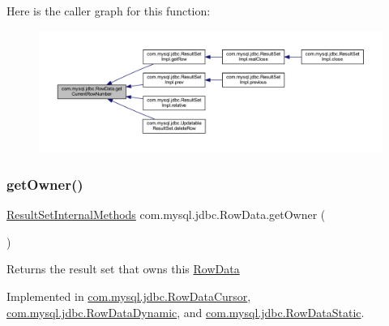 Here is the caller graph for this function\+:
\nopagebreak
\begin{figure}[H]
\begin{center}
\leavevmode
\includegraphics[width=350pt]{interfacecom_1_1mysql_1_1jdbc_1_1_row_data_aec8ec45fafa52ded12507aa708efbdf7_icgraph}
\end{center}
\end{figure}
\mbox{\label{interfacecom_1_1mysql_1_1jdbc_1_1_row_data_adb65eef9f8713ed4c3a1eb67eafaaf86}} 
\subsubsection{\texorpdfstring{get\+Owner()}{getOwner()}}
{\footnotesize\ttfamily \mbox{\hyperlink{interfacecom_1_1mysql_1_1jdbc_1_1_result_set_internal_methods}{Result\+Set\+Internal\+Methods}} com.\+mysql.\+jdbc.\+Row\+Data.\+get\+Owner (\begin{DoxyParamCaption}{ }\end{DoxyParamCaption})}

Returns the result set that \textquotesingle{}owns\textquotesingle{} this \mbox{\hyperlink{interfacecom_1_1mysql_1_1jdbc_1_1_row_data}{Row\+Data}} 

Implemented in \mbox{\hyperlink{classcom_1_1mysql_1_1jdbc_1_1_row_data_cursor_a82d9aac57045528a72f5d979fe7490bd}{com.\+mysql.\+jdbc.\+Row\+Data\+Cursor}}, \mbox{\hyperlink{classcom_1_1mysql_1_1jdbc_1_1_row_data_dynamic_af879dc010e19afaf62c037d9cfca5c8f}{com.\+mysql.\+jdbc.\+Row\+Data\+Dynamic}}, and \mbox{\hyperlink{classcom_1_1mysql_1_1jdbc_1_1_row_data_static_af72520ce25978b10995a00de1bd2ecc4}{com.\+mysql.\+jdbc.\+Row\+Data\+Static}}.

\mbox{\label{interfacecom_1_1mysql_1_1jdbc_1_1_row_data_a630ce5b4cd86f8b4d7f71548797c4c16}} 
